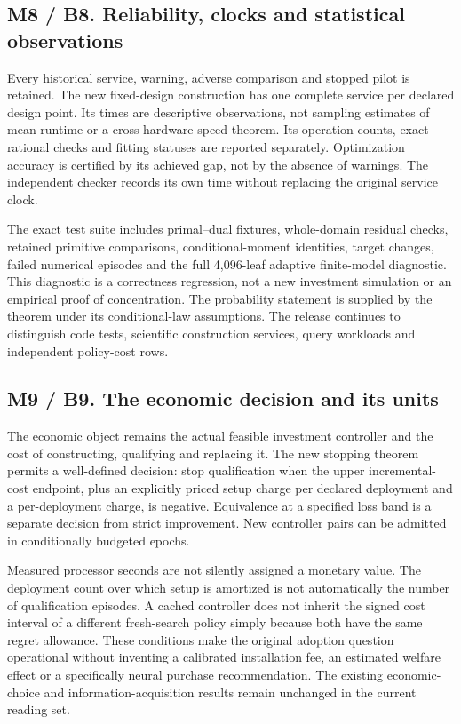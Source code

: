 \documentclass[ecta,nameyear,draft]{econsocart}
\begin{document}
\hypertarget{m8-b8.-reliability-clocks-and-statistical-observations}{%
\subsection{M8 / B8. Reliability, clocks and statistical
observations}\label{m8-b8.-reliability-clocks-and-statistical-observations}}

Every historical service, warning, adverse comparison and stopped pilot
is retained. The new fixed-design construction has one complete service
per declared design point. Its times are descriptive observations, not
sampling estimates of mean runtime or a cross-hardware speed theorem.
Its operation counts, exact rational checks and fitting statuses are
reported separately. Optimization accuracy is certified by its achieved
gap, not by the absence of warnings. The independent checker records its
own time without replacing the original service clock.

The exact test suite includes primal--dual fixtures, whole-domain
residual checks, retained primitive comparisons, conditional-moment
identities, target changes, failed numerical episodes and the full
4,096-leaf adaptive finite-model diagnostic. This diagnostic is a
correctness regression, not a new investment simulation or an empirical
proof of concentration. The probability statement is supplied by the
theorem under its conditional-law assumptions. The release continues to
distinguish code tests, scientific construction services, query
workloads and independent policy-cost rows.

\hypertarget{m9-b9.-the-economic-decision-and-its-units}{%
\subsection{M9 / B9. The economic decision and its
units}\label{m9-b9.-the-economic-decision-and-its-units}}

The economic object remains the actual feasible investment controller
and the cost of constructing, qualifying and replacing it. The new
stopping theorem permits a well-defined decision: stop qualification
when the upper incremental-cost endpoint, plus an explicitly priced
setup charge per declared deployment and a per-deployment charge, is
negative. Equivalence at a specified loss band is a separate decision
from strict improvement. New controller pairs can be admitted in
conditionally budgeted epochs.

Measured processor seconds are not silently assigned a monetary value.
The deployment count over which setup is amortized is not automatically
the number of qualification episodes. A cached controller does not
inherit the signed cost interval of a different fresh-search policy
simply because both have the same regret allowance. These conditions
make the original adoption question operational without inventing a
calibrated installation fee, an estimated welfare effect or a
specifically neural purchase recommendation. The existing
economic-choice and information-acquisition results remain unchanged in
the current reading set.
\end{document}

